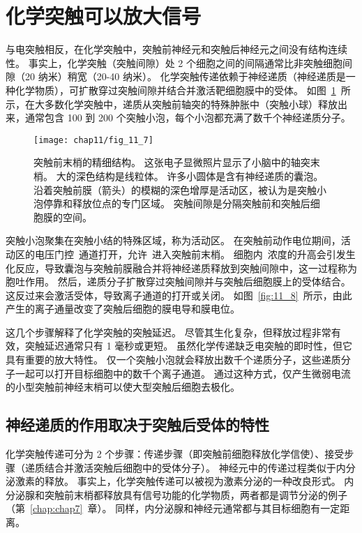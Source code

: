 \section{化学突触可以放大信号}

与电突触相反，在化学突触中，突触前神经元和突触后神经元之间没有结构连续性。
事实上，化学突触（突触间隙）处 2 个细胞之间的间隔通常比非突触细胞间隙（20 纳米）稍宽（20-40 纳米）。
化学突触传递依赖于神经递质（神经递质是一种化学物质），可扩散穿过突触间隙并结合并激活靶细胞膜中的受体。
如图~\ref{fig:11_7}~所示，在大多数化学突触中，递质从突触前轴突的特殊肿胀中（突触小球）释放出来，通常包含 100 到 200 个突触小泡，每个小泡都充满了数千个神经递质分子。


\begin{figure}[htbp]
	\centering
	\texttt{[image: chap11/fig\_11\_7]}
	\caption{突触前末梢的精细结构。
		这张电子显微照片显示了小脑中的轴突末梢。
		大的深色结构是线粒体。
		许多小圆体是含有神经递质的囊泡。
		沿着突触前膜（箭头）的模糊的深色增厚是活动区，被认为是突触小泡停靠和释放位点的专门区域。
		突触间隙是分隔突触前和突触后细胞膜的空间。}
	\label{fig:11_7}
\end{figure}


突触小泡聚集在突触小结的特殊区域，称为活动区。
在突触前动作电位期间，活动区的电压门控~通道打开，允许~进入突触前末梢。
细胞内~浓度的升高会引发生化反应，导致囊泡与突触前膜融合并将神经递质释放到突触间隙中，这一过程称为胞吐作用。
然后，递质分子扩散穿过突触间隙并与突触后细胞膜上的受体结合。
这反过来会激活受体，导致离子通道的打开或关闭。
如图~\ref{fig:11_8}~所示，由此产生的离子通量改变了突触后细胞的膜电导和膜电位。


这几个步骤解释了化学突触的突触延迟。
尽管其生化复杂，但释放过程非常有效，突触延迟通常只有 1 毫秒或更短。
虽然化学传递缺乏电突触的即时性，但它具有重要的放大特性。
仅一个突触小泡就会释放出数千个递质分子，这些递质分子一起可以打开目标细胞中的数千个离子通道。
通过这种方式，仅产生微弱电流的小型突触前神经末梢可以使大型突触后细胞去极化。



\subsection{神经递质的作用取决于突触后受体的特性}

化学突触传递可分为 2 个步骤：传递步骤（即突触前细胞释放化学信使）、接受步骤（递质结合并激活突触后细胞中的受体分子）。
神经元中的传递过程类似于内分泌激素的释放。
事实上，化学突触传递可以被视为激素分泌的一种改良形式。
内分泌腺和突触前末梢都释放具有信号功能的化学物质，两者都是调节分泌的例子（第~\ref{chap:chap7}~章）。
同样，内分泌腺和神经元通常都与其目标细胞有一定距离。


